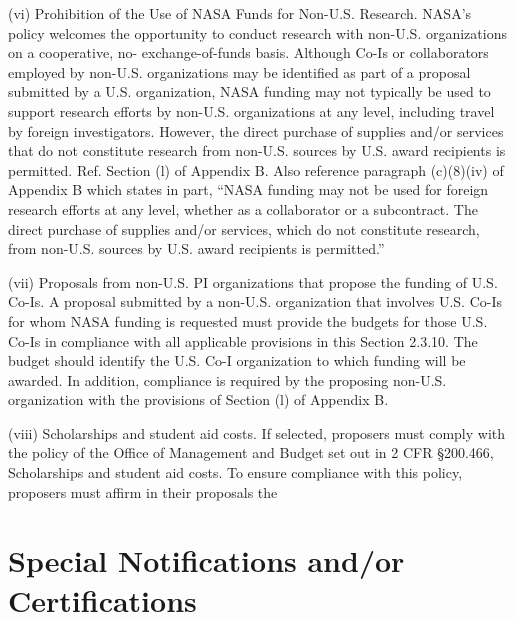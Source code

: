 \documentclass[12pt]{article}
\begin{document}
(vi) Prohibition of the Use of NASA Funds for
Non-U.S. Research. NASA's policy welcomes the opportunity to conduct
research with non-U.S. organizations on a cooperative, no-
exchange-of-funds basis. Although Co-Is or collaborators employed by
non-U.S. organizations may be identified as part of a proposal
submitted by a U.S. organization, NASA funding may not typically be
used to support research efforts by non-U.S. organizations at any
level, including travel by foreign investigators. However, the direct
purchase of supplies and/or services that do not constitute research
from non-U.S. sources by U.S. award recipients is
permitted. Ref. Section (l) of Appendix B. Also reference paragraph
(c)(8)(iv) of Appendix B which states in part, ``NASA funding may not
be used for foreign research efforts at any level, whether as a
collaborator or a subcontract. The direct purchase of supplies and/or
services, which do not constitute research, from non-U.S. sources by
U.S. award recipients is permitted.''

(vii) Proposals from non-U.S. PI organizations that propose the
funding of U.S. Co-Is. A proposal submitted by a non-U.S. organization
that involves U.S. Co-Is for whom NASA funding is requested must
provide the budgets for those U.S. Co-Is in compliance with all
applicable provisions in this Section 2.3.10. The budget should
identify the U.S. Co-I organization to which funding will be
awarded. In addition, compliance is required by the proposing
non-U.S. organization with the provisions of Section (l) of Appendix
B.

(viii) Scholarships and student aid costs. If selected, proposers must comply with the policy of the Office of Management and Budget set out in 2 CFR \S200.466, Scholarships and student aid costs. To ensure compliance with this policy, proposers must affirm in their
proposals the







\cleardoublepage

\section*{Special Notifications and/or Certifications}


\end{document}
